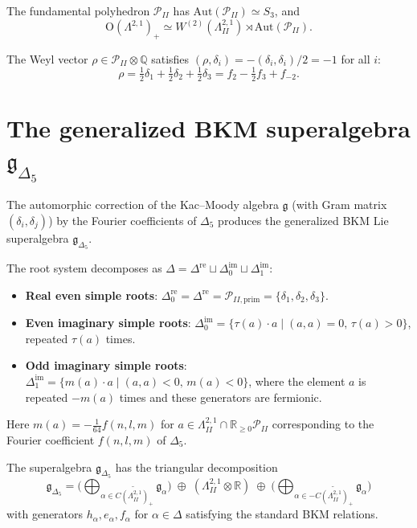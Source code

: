 The fundamental polyhedron $\mathcal{P}_{II}$ has $\mathrm{Aut}(\mathcal{P}_{II}) \simeq S_3$, and
\[
 \mathrm{O}(\Lambda^{2,1})_+ \simeq W^{(2)}(\Lambda^{2,1}_{II}) \rtimes \mathrm{Aut}(\mathcal{P}_{II}).
\]

\begin{definition}
\label{def:k3e-weyl-vector}
The Weyl vector $\rho \in \mathcal{P}_{II} \otimes \mathbb{Q}$ satisfies $(\rho, \delta_i) = -(\delta_i, \delta_i)/2 = -1$ for all $i$:
\[
 \rho = \tfrac{1}{2}\delta_1 + \tfrac{1}{2}\delta_2 + \tfrac{1}{2}\delta_3 = f_2 - \tfrac{1}{2}f_3 + f_{-2}.
\]
\end{definition}

\section{The generalized BKM superalgebra $\mathfrak{g}_{\Delta_5}$}
\label{sec:k3e-bkm}

The automorphic correction of the Kac--Moody algebra $\mathfrak{g}$ (with Gram matrix $(\delta_i, \delta_j)$) by the Fourier coefficients of $\Delta_5$ produces the generalized BKM Lie superalgebra $\mathfrak{g}_{\Delta_5}$.

\begin{construction}
\label{constr:k3e-roots}
The root system decomposes as $\Delta = \Delta^{\mathrm{re}} \sqcup \Delta^{\mathrm{im}}_0 \sqcup \Delta^{\mathrm{im}}_1$:
\begin{itemize}
 \item \textbf{Real even simple roots}: $\Delta^{\mathrm{re}}_0 = \Delta^{\mathrm{re}} = \mathcal{P}_{II,\mathrm{prim}} = \{\delta_1, \delta_2, \delta_3\}$.
 \item \textbf{Even imaginary simple roots}: $\Delta^{\mathrm{im}}_0 = \{ \tau(a) \cdot a \mid (a,a) = 0, \, \tau(a) > 0 \}$, repeated $\tau(a)$ times.
 \item \textbf{Odd imaginary simple roots}: $\Delta^{\mathrm{im}}_1 = \{ m(a) \cdot a \mid (a,a) < 0, \, m(a) < 0 \}$, where the element $a$ is repeated $-m(a)$ times and these generators are fermionic.
\end{itemize}
Here $m(a) = -\frac{1}{64} f(n,l,m)$ for $a \in \Lambda^{2,1}_{II} \cap \mathbb{R}_{\geq 0} \mathcal{P}_{II}$ corresponding to the Fourier coefficient $f(n,l,m)$ of $\Delta_5$.
\end{construction}

The superalgebra $\mathfrak{g}_{\Delta_5}$ has the triangular decomposition
\[
 \mathfrak{g}_{\Delta_5} = \biggl(\bigoplus_{\alpha \in \widetilde{C(\Lambda^{2,1}_{II})_+}} \mathfrak{g}_\alpha\biggr) \;\oplus\; (\Lambda^{2,1}_{II} \otimes \mathbb{R}) \;\oplus\; \biggl(\bigoplus_{\alpha \in -\widetilde{C(\Lambda^{2,1}_{II})_+}} \mathfrak{g}_\alpha\biggr)
\]
with generators $h_\alpha, e_\alpha, f_\alpha$ for $\alpha \in \Delta$ satisfying the standard BKM relations.

